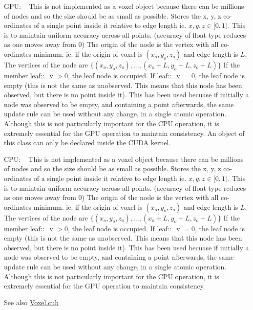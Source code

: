 G\+PU\+: ~\newline
 This is not implemented as a voxel object because there can be millions of nodes and so the size should be as small as possible. Stores the x, y, z co-\/ordinates of a single point inside it relative to edge length ie. $x, y, z \in [0,1)$. This is to maintain uniform accuracy across all points. (accuracy of float type reduces as one moves away from 0) The origin of the node is the vertex with all co-\/ordinates minimum. ie. if the origin of voxel is $(x_o, y_o, z_o)$ and edge length is $L$, The vertices of the node are $\{(x_o, y_o, z_o), ..., (x_o+L, y_o+L, z_o+L)\}$ If the member \hyperlink{classleaf_a4fc347dbd4f5911bbb477910588ed512}{leaf\+::\+\_\+v} $> 0$, the leaf node is occupied. If \hyperlink{classleaf_a4fc347dbd4f5911bbb477910588ed512}{leaf\+::\+\_\+v} $= 0$, the leaf node is empty (this is not the same as unobserved. This means that this node has been observed, but there is no point inside it). This has been used becuase if initially a node was observed to be empty, and containing a point afterwards, the same update rule can be used without any change, in a single atomic operation. Although this is not particularly important for the C\+PU operation, it is extremely essential for the G\+PU operation to maintain consistency. An object of this class can only be declared inside the C\+U\+DA kernel.

C\+PU\+: ~\newline
 This is not implemented as a voxel object because there can be millions of nodes and so the size should be as small as possible. Stores the x, y, z co-\/ordinates of a single point inside it relative to edge length ie. $x, y, z \in [0,1)$. This is to maintain uniform accuracy across all points. (accuracy of float type reduces as one moves away from 0) The origin of the node is the vertex with all co-\/ordinates minimum. ie. if the origin of voxel is $(x_o, y_o, z_o)$ and edge length is $L$, The vertices of the node are $\{(x_o, y_o, z_o), ..., (x_o+L, y_o+L, z_o+L)\}$ If the member \hyperlink{classleaf_a4fc347dbd4f5911bbb477910588ed512}{leaf\+::\+\_\+v} $> 0$, the leaf node is occupied. If \hyperlink{classleaf_a4fc347dbd4f5911bbb477910588ed512}{leaf\+::\+\_\+v} $= 0$, the leaf node is empty (this is not the same as unobserved. This means that this node has been observed, but there is no point inside it). This has been used becuase if initially a node was observed to be empty, and containing a point afterwards, the same update rule can be used without any change, in a single atomic operation. Although this is not particularly important for the C\+PU operation, it is extremely essential for the G\+PU operation to maintain consistency. \begin{DoxySeeAlso}{See also}
\hyperlink{Voxel_8cuh}{Voxel.\+cuh} 
\end{DoxySeeAlso}


